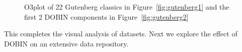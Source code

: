 \documentclass[11pt]{article}
\begin{document}
\begin{figure}[!t]
	\centering
	\caption{O3plot of 22 Gutenberg classics in Figure~\ref{fig:gutenberg1} and the first 2 DOBIN components in Figure~\ref{fig:gutenberg2} }
	\label{fig:gutenberg}
\end{figure}

This completes the visual analysis of datasets. Next we  explore the effect of DOBIN on an extensive data repository. 

\end{document}
